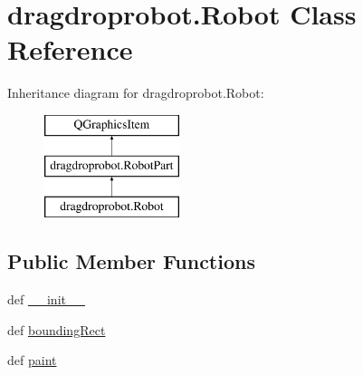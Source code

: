 \hypertarget{classdragdroprobot_1_1Robot}{}\section{dragdroprobot.\+Robot Class Reference}
\label{classdragdroprobot_1_1Robot}
Inheritance diagram for dragdroprobot.\+Robot\+:\begin{figure}[H]
\begin{center}
\leavevmode
\includegraphics[height=3.000000cm]{classdragdroprobot_1_1Robot}
\end{center}
\end{figure}
\subsection*{Public Member Functions}
\begin{DoxyCompactItemize}
\item 
def \hyperlink{classdragdroprobot_1_1Robot_a0387ffffb42998860c7451b4d6c0f008}{\+\_\+\+\_\+init\+\_\+\+\_\+}
\item 
def \hyperlink{classdragdroprobot_1_1Robot_abca621b846430273119ed096f9092266}{bounding\+Rect}
\item 
def \hyperlink{classdragdroprobot_1_1Robot_a2ab090504cdafcc3de648d0a694c05cf}{paint}
\end{DoxyCompactItemize}
